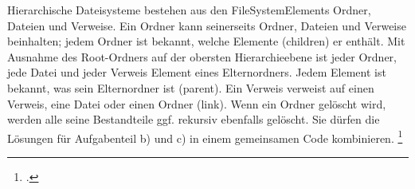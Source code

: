 \documentclass{lehramt-informatik-aufgabe}
\begin{document}

Hierarchische Dateisysteme bestehen aus den FileSystemElements Ordner,
Dateien und Verweise. Ein Ordner kann seinerseits Ordner, Dateien und
Verweise beinhalten; jedem Ordner ist bekannt, welche Elemente
(children) er enthält. Mit Ausnahme des Root-Ordners auf der obersten
Hierarchieebene ist jeder Ordner, jede Datei und jeder Verweis Element
eines Elternordners. Jedem Element ist bekannt, was sein Elternordner
ist (parent). Ein Verweis verweist auf einen Verweis, eine Datei oder
einen Ordner (link). Wenn ein Ordner gelöscht wird, werden alle seine
Bestandteile ggf. rekursiv ebenfalls gelöscht. Sie dürfen die Lösungen
für Aufgabenteil b) und c) in einem gemeinsamen Code kombinieren.
\footcite{examen:66116:2019:09}
\end{document}
